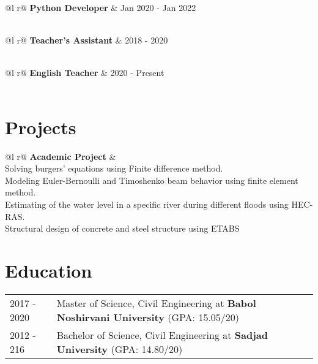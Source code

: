 \documentclass[a4paper,12pt]{article}
\begin{document}
\begin{tabularx}{\linewidth}{ @{}l r@{} }
\textbf{Python Developer} & \hfill Jan 2020 - Jan 2022 \\[3.75pt]
  \\
\end{tabularx}
\begin{tabularx}{\linewidth}{ @{}l r@{} }
\textbf{Teacher's Assistant} & \hfill  2018 - 2020 \\[3.75pt]
  \\
\end{tabularx}
\begin{tabularx}{\linewidth}{ @{}l r@{} }
\textbf{English Teacher} & \hfill  2020 - Present \\[3.75pt]
  \\
\end{tabularx}

\section{Projects}

\begin{tabularx}{\linewidth}{ @{}l r@{} }
\textbf{Academic Project} & \hfill  \\[3.75pt]
{Solving burgers’ equations using Finite difference method.}\\
{Modeling Euler-Bernoulli and Timoshenko beam behavior using finite element method}.\\
{Estimating of the water level in a specific river during different floods using HEC-RAS.}  \\
{Structural design of concrete and steel structure using ETABS}\\
\end{tabularx}

\section{Education}
\begin{tabularx}{\linewidth}{@{}l X@{}}	
2017 - 2020 & Master of Science, Civil Engineering  at \textbf{Babol Noshirvani University} \hfill \normalsize (GPA: 15.05/20) \\


2012 - 216 & Bachelor of Science, Civil Engineering at \textbf{Sadjad University} \hfill (GPA: 14.80/20) \\

\end{tabularx}
\end{document}
